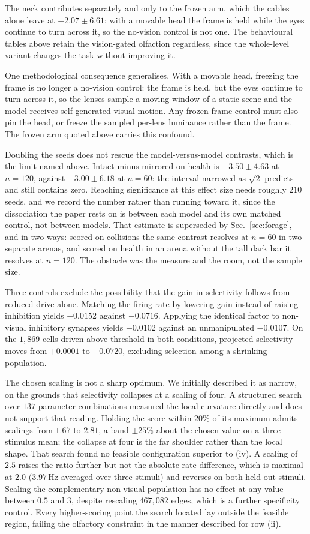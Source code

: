 \documentclass[10pt,twoside]{article}
\begin{document}
The neck contributes separately and only to the frozen arm, which the cables
alone leave at $+2.07\pm6.61$: with a movable head the frame is held while the
eyes continue to turn across it, so the no-vision control is not one. The behavioural
tables above retain the vision-gated olfaction regardless, since the
whole-level variant changes the task without improving it.

One methodological consequence generalises. With a movable head, freezing the
frame is no longer a no-vision control: the frame is held, but the eyes
continue to turn across it, so the lenses sample a moving window of a static
scene and the model receives self-generated visual motion. Any frozen-frame
control must also pin the head, or freeze the sampled per-lens luminance rather
than the frame. The frozen arm quoted above carries this confound.

Doubling the seeds does not rescue the model-versus-model contrasts, which is
the limit named above. Intact minus mirrored on health is $+3.50\pm4.63$ at
$n=120$, against $+3.00\pm6.18$ at $n=60$: the interval narrowed as
$\sqrt{2}$ predicts and still contains zero. Reaching significance at this
effect size needs roughly $210$ seeds, and we record the number rather than
running toward it, since the dissociation the paper rests on is between each
model and its own matched control, not between models. That estimate is
superseded by Sec.~\ref{sec:forage}, and in two ways: scored on collisions the
same contrast resolves at $n=60$ in two separate arenas, and scored on health in
an arena without the tall dark bar it resolves at $n=120$. The obstacle was the
measure and the room, not the sample size.

Three controls exclude the possibility that the gain in selectivity follows
from reduced drive alone. Matching the firing rate by lowering gain instead of raising
inhibition yields $-0.0152$ against $-0.0716$. Applying the identical factor to
non-visual inhibitory synapses yields $-0.0102$ against an unmanipulated
$-0.0107$. On the $1{,}869$ cells driven above threshold in both conditions,
projected selectivity moves from $+0.0001$ to $-0.0720$, excluding selection
among a shrinking population.

The chosen scaling is not a sharp optimum. We initially described it as narrow, on the grounds that selectivity
collapses at a scaling of four. A structured search over $137$ parameter
combinations measured the local curvature directly and does not support that
reading. Holding the score within $20\%$ of its maximum admits scalings from
$1.67$ to $2.81$, a band $\pm25\%$ about the chosen value on a three-stimulus
mean; the collapse at four is the far shoulder rather than the local shape.
That search found no feasible configuration superior to (iv). A scaling of
$2.5$ raises the ratio further but not the absolute rate difference, which is
maximal at $2.0$ ($3.97$\,Hz averaged over three stimuli) and reverses on both
held-out stimuli. Scaling the complementary non-visual population has no effect
at any value between $0.5$ and $3$, despite rescaling $467{,}082$ edges, which
is a further specificity control. Every higher-scoring point the search located
lay outside the feasible region, failing the olfactory constraint in the manner
described for row (ii).
\end{document}
